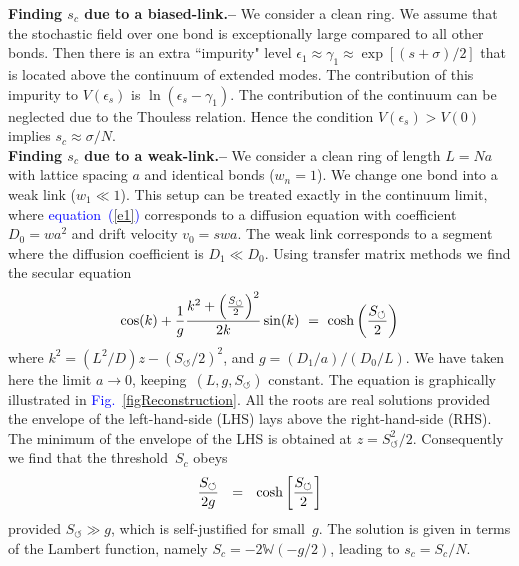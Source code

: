 \documentclass[aps,pre,floats,floatfix,twocolumn]{revtex4}
\newcommand{\be}[1]{\begin{eqnarray}\ifthenelse{#1=-1}{\nonumber}{\ifthenelse{#1=0}{}{\label{e#1}}}}
\newcommand{\eeq}{\end{eqnarray}}
\newcommand{\Eq}[1]{\textcolor{blue}{{equation}\!~(\ref{#1})}}
\newcommand{\Fig}[1]{\textcolor{blue}{Fig.}\!\!~\ref{#1}}
\newcommand{\sect}[1]{{\bf #1.-- }}
\begin{document}
\sect{Finding $s_c$ due to a biased-link}
%
We consider a clean ring. We assume that the stochastic field 
over one bond is exceptionally large compared to all other bonds.   
Then there is an extra ``impurity" level  
${\epsilon_1 \approx \gamma_1 \approx \exp[(s+\sigma)/2]}$ 
that is located above the continuum of extended modes. 
The contribution of this impurity to $V(\epsilon_s)$ 
is $\ln(\epsilon_s-\gamma_1)$. 
The contribution of the continuum can be neglected 
due to the Thouless relation. 
Hence the condition ${V(\epsilon_s)>V(0)}$ 
implies $s_c \approx \sigma/N$. 
\\     


\sect{Finding $s_c$ due to a weak-link}
%
We consider a clean ring of length ${L=Na}$ with lattice spacing $a$ 
and identical bonds (${w_n=1}$).  
We change one bond into a weak link (${w_1 \ll 1}$). 
This setup can be treated exactly in the continuum limit, 
where \Eq{e1} corresponds to a diffusion equation  
with coefficient ${D_0=wa^2}$ and drift velocity ${v_0=swa}$.  
The weak link corresponds to a segment 
where the diffusion coefficient is ${D_1 \ll D_0}$.  
Using transfer matrix methods we find the secular equation 
%
\be{50}
\cos(k) + \frac{1}{g} \frac{k^2+\left(\frac{S_{\circlearrowleft}}{2}\right)^2}{2k}\sin(k)
\ = \ \cosh \left(\frac{S_{\circlearrowleft}}{2} \right)
\eeq
%
where ${k^2= (L^2/D) z - (S_{\circlearrowleft}/2)^2}$, 
and $g=(D_1/a)/(D_0/L)$. We have taken here 
the limit ${a\rightarrow0}$, keeping~$(L,g,S_{\circlearrowleft})$ constant. 
The equation is graphically illustrated in \Fig{figReconstruction}. 
All the roots are real solutions provided the envelope 
of the left-hand-side (LHS) lays above the right-hand-side (RHS).
The minimum of the envelope of the LHS is obtained at ${z = S_{\circlearrowleft}^2/2}$.
Consequently we find that the threshold~$S_c$ obeys 
%
\be{23}
\frac{S_{\circlearrowleft}}{2g} \ \ = \ \ \cosh\left[ \frac{S_{\circlearrowleft}}{2} \right]
\eeq
%
provided $S_{\circlearrowleft} \gg g$, which is self-justified for small~$g$.   
The solution is given in terms of the Lambert function, 
namely ${S_c = -2 \mathbb{W}(-g/2)}$, leading to ${s_c=S_c/N}$.
\end{document}
